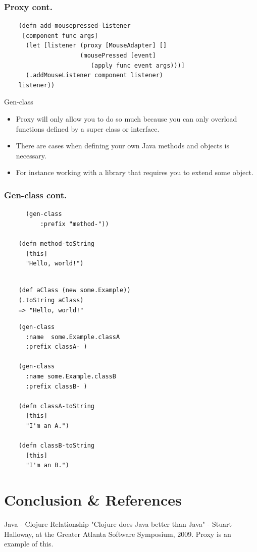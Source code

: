 \documentclass[xcolor=dvipsnames]{beamer}
\begin{document}
	\begin{frame}[fragile]
	\frametitle{Proxy cont.}
	\begin{verbatim}
	(defn add-mousepressed-listener
     [component func args]
      (let [listener (proxy [MouseAdapter] []
                     (mousePressed [event]
                        (apply func event args)))]
      (.addMouseListener component listener)
    listener))
	\end{verbatim}
	\end{frame}
	
	\begin{frame}{Gen-class}
	\begin{itemize}	
	\item Proxy will only allow you to do so much because you can only overload functions defined by a super class or interface.
	\pause
	\item There are cases when defining your own Java methods and objects is necessary.
	\item For instance working with a library that requires you to extend some object. 
	\end{itemize}
	\end{frame}
	
	\begin{frame}[fragile]
	\frametitle{Gen-class cont.}
		\begin{verbatim}
	  (gen-class 
	      :prefix "method-"))
	  
	(defn method-toString
	  [this]
	  "Hello, world!")
	  
	\end{verbatim}
	\pause
	\begin{verbatim}
	(def aClass (new some.Example))
	(.toString aClass)
	=> "Hello, world!"
	\end{verbatim}
	\end{frame}
	
	\begin{frame}[fragile]
		\begin{verbatim}
	(gen-class
	  :name  some.Example.classA
	  :prefix classA- )
	  
	(gen-class
	  :name some.Example.classB
	  :prefix classB- )
	  
	(defn classA-toString
	  [this]
	  "I'm an A.")
	  
	(defn classB-toString
	  [this]
	  "I'm an B.")
	\end{verbatim}
	\end{frame}
	
	\section{Conclusion \& References}
	\begin{frame}{Java - Clojure Relationship}
	"Clojure does Java better than Java" - Stuart Halloway, at the Greater Atlanta Software Symposium, 2009.
	\linebreak
	Proxy is an example of this.
	\end{frame}
	
\end{document}
